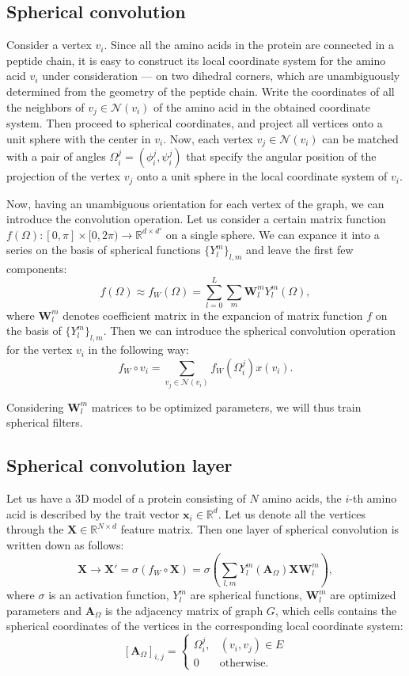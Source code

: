 \documentclass[12pt,twoside]{article}
\begin{document}
	\subsection{Spherical convolution}
	Consider a vertex $v_i$. Since all the amino acids in the protein are connected in a peptide chain, it is easy to
	construct its local coordinate system for the amino acid $v_i$ under consideration — on two dihedral corners,
	which are unambiguously determined from the geometry of the peptide chain. Write the coordinates of all the neighbors of $v_j \in \mathcal{N}(v_i)$
	of the amino acid in the obtained coordinate system. Then proceed to spherical coordinates, and project all vertices onto a unit sphere
	with the center in $v_i$. Now, each vertex $v_j \in \mathcal{N}(v_i)$ can be matched with a pair of angles $\Omega_i^j = (\phi_i^j, \psi_i^j)$ that specify the
	angular position of the projection of the vertex $v_j$ onto a unit sphere in the local coordinate system of $v_i$.

	Now, having an unambiguous orientation for each vertex of the graph, we can introduce the convolution operation. Let us consider a certain 
	matrix function $f(\Omega) : [0, \pi] \times [0, 2\pi) \rightarrow \mathbb{R}^{d \times d'} $ on a single sphere. We can expance it
	into a series on the basis of spherical functions $\{Y_l^m\}_{l,m}$ and leave the first few components:
	$$
		f(\Omega) \approx f_W(\Omega) = \sum_{l=0}^{L}\sum_m \boldsymbol{W}_l^m Y_l^m(\Omega),
	$$
	where $\boldsymbol{W}_l^m$ denotes coefficient matrix in the expancion of matrix function $f$ on the basis of $\{Y_l^m\}_{l,m}$. Then
	we can introduce the spherical convolution operation for the vertex $v_i$ in the following way:
	$$f_W \circ v_i = \sum_{v_j \in \mathcal{N}(v_i)} f_W(\Omega_i^j)x(v_i).$$

	Considering $\boldsymbol{W}_l^m$ matrices to be optimized parameters, we will thus train spherical filters.

	\subsection{Spherical convolution layer}
	Let us have a 3D model of a protein consisting of $N$ amino acids, the $i$-th amino acid is described by the trait vector $\boldsymbol{x}_i \in \mathbb{R}^d$.
	Let us denote all the vertices through the $\boldsymbol{X} \in \mathbb{R}^{N \times d}$ feature matrix. Then one layer of spherical
	convolution is written down as follows:
	$$
		\boldsymbol{X} \longrightarrow \boldsymbol{X}' = \sigma(f_W \circ \boldsymbol{X}) = \sigma\left(\sum_{l,m}Y_l^m(\boldsymbol{A}_\Omega)\boldsymbol{X}\boldsymbol{W}_l^m\right),
	$$
	where $\sigma$ is an activation function, $Y_l^m$ are spherical functions, $\boldsymbol{W}_l^m$ are optimized parameters and $\boldsymbol{A}_\Omega$
	is the adjacency matrix of graph $G$, which cells contains the spherical coordinates of the vertices in the corresponding local coordinate system:
	$$
		[\boldsymbol{A}_\Omega]_{i,j} = \begin{cases}
			\Omega_i^j, & (v_i, v_j) \in E \\
			0 & \text{otherwise}.
		\end{cases}
	$$
\end{document}
